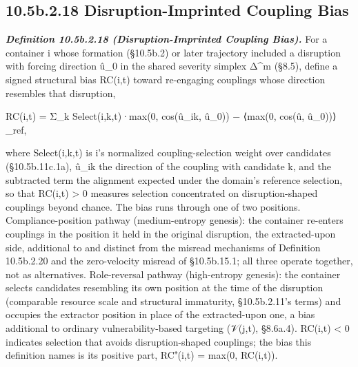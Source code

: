 \documentclass[
]{article}
\begin{document}
\hypertarget{b.2.18-disruption-imprinted-coupling-bias}{%
\subsection{10.5b.2.18 Disruption-Imprinted Coupling
Bias}\label{b.2.18-disruption-imprinted-coupling-bias}}

\emph{\textbf{Definition 10.5b.2.18 (Disruption-Imprinted Coupling
Bias).}} For a container i whose formation (§10.5b.2) or later
trajectory included a disruption with forcing direction û\_0 in the
shared severity simplex Δ\^{}m (§8.5), define a signed structural bias
RC(i,t) toward re-engaging couplings whose direction resembles that
disruption,

RC(i,t) = Σ\_k Select(i,k,t)·max(0, cos(û\_ik, û\_0)) − ⟨max(0, cos(û,
û\_0))⟩\_ref,

where Select(i,k,t) is i's normalized coupling-selection weight over
candidates (§10.5b.11c.1a), û\_ik the direction of the coupling with
candidate k, and the subtracted term the alignment expected under the
domain's reference selection, so that RC(i,t) \textgreater{} 0 measures
selection concentrated on disruption-shaped couplings beyond chance. The
bias runs through one of two positions. Compliance-position pathway
(medium-entropy genesis): the container re-enters couplings in the
position it held in the original disruption, the extracted-upon side,
additional to and distinct from the misread mechanisms of Definition
10.5b.2.20 and the zero-velocity misread of §10.5b.15.1; all three
operate together, not as alternatives. Role-reversal pathway
(high-entropy genesis): the container selects candidates resembling its
own position at the time of the disruption (comparable resource scale
and structural immaturity, §10.5b.2.11's terms) and occupies the
extractor position in place of the extracted-upon one, a bias additional
to ordinary vulnerability-based targeting (𝒱(j,t), §8.6a.4). RC(i,t)
\textless{} 0 indicates selection that avoids disruption-shaped
couplings; the bias this definition names is its positive part, RC⁺(i,t)
= max(0, RC(i,t)).
\end{document}
